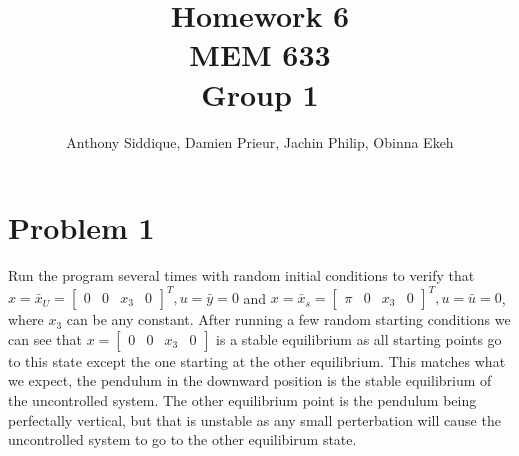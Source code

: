 \documentclass{article}
\author{Anthony Siddique, Damien Prieur, Jachin Philip, Obinna Ekeh}
\title{Homework 6\\ MEM 633 \\ Group 1}
\date{}
\begin{document}
\maketitle

\section*{Problem 1}
Run the program several times with random initial conditions to verify that
$x = \bar{x}_U = \begin{bmatrix} 0 & 0 & x_3 & 0 \end{bmatrix}^T, u = \bar{y} = 0$
and $x = \bar{x}_s = \begin{bmatrix} \pi & 0 & x_3 & 0 \end{bmatrix}^T, u = \bar{u} = 0$,
where $x_3$ can be any constant.
\newline
\newline
After running a few random starting conditions we can see that
$ x = \begin{bmatrix} 0 & 0 & x_3 & 0 \end{bmatrix} $
is a stable equilibrium as all starting points go to this state except the one starting at the other equilibrium.
This matches what we expect, the pendulum in the downward position is the stable equilibrium of the uncontrolled system.
The other equilibrium point is the pendulum being perfectally vertical, but that is unstable as any small perterbation will cause the uncontrolled system to go to the other equilibirum state.
\end{document}
